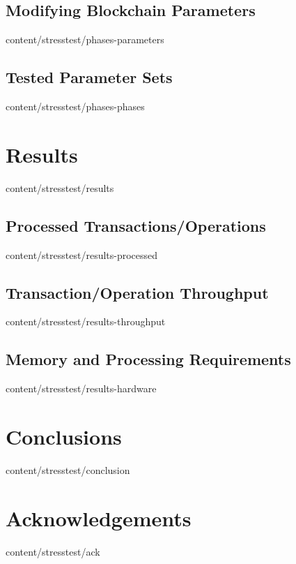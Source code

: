 \documentclass{btswhitepaper}
\begin{document}
\subsection { Modifying Blockchain Parameters    }  { content/stresstest/phases-parameters  } 
\subsection { Tested Parameter Sets              }  { content/stresstest/phases-phases      } 
\section    { Results                            }  { content/stresstest/results            } 
\subsection { Processed Transactions/Operations  }  { content/stresstest/results-processed  } 
\subsection { Transaction/Operation Throughput   }  { content/stresstest/results-throughput } 
\subsection { Memory and Processing Requirements }  { content/stresstest/results-hardware   } 
\section    { Conclusions                        }  { content/stresstest/conclusion         } 
\section    { Acknowledgements                   }  { content/stresstest/ack                } 



\end{document}
